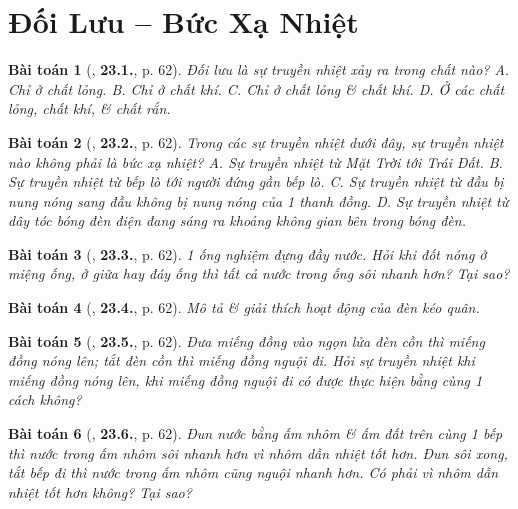 \documentclass{article}
\numberwithin{equation}{section}
\newtheorem{baitoan}{Bài toán}
\begin{document}

\section{Đối Lưu -- Bức Xạ Nhiệt}

\begin{baitoan}[\cite{SBT_Vat_Ly_8}, \textbf{23.1.}, p. 62]
	Đối lưu là sự truyền nhiệt xảy ra trong chất nào? {\sf A.} Chỉ ở chất lỏng. {\sf B.} Chỉ ở chất khí. {\sf C.} Chỉ ở chất lỏng \& chất khí. {\sf D.} Ở các chất lỏng, chất khí, \& chất rắn.
\end{baitoan}

\begin{baitoan}[\cite{SBT_Vat_Ly_8}, \textbf{23.2.}, p. 62]
	Trong các sự truyền nhiệt dưới đây, sự truyền nhiệt nào không phải là bức xạ nhiệt? {\sf A.} Sự truyền nhiệt từ Mặt Trời tới Trái Đất. {\sf B.} Sự truyền nhiệt từ bếp lò tới người đứng gần bếp lò. {\sf C.} Sự truyền nhiệt từ đầu bị nung nóng sang đầu không bị nung nóng của 1 thanh đồng. {\sf D.} Sự truyền nhiệt từ dây tóc bóng đèn điện đang sáng ra khoảng không gian bên trong bóng đèn.
\end{baitoan}

\begin{baitoan}[\cite{SBT_Vat_Ly_8}, \textbf{23.3.}, p. 62]
	1 ống nghiệm đựng đầy nước. Hỏi khi đốt nóng ở miệng ống, ở giữa hay đáy ống thì tất cả nước trong ống sôi nhanh hơn? Tại sao?
\end{baitoan}

\begin{baitoan}[\cite{SBT_Vat_Ly_8}, \textbf{23.4.}, p. 62]
	Mô tả \& giải thích hoạt động của đèn kéo quân.
\end{baitoan}

\begin{baitoan}[\cite{SBT_Vat_Ly_8}, \textbf{23.5.}, p. 62]
	Đưa miếng đồng vào ngọn lửa đèn cồn thì miếng đồng nóng lên; tắt đèn cồn thì miếng đồng nguội đi. Hỏi sự truyền nhiệt khi miếng đồng nóng lên, khi miếng đồng nguội đi có được thực hiện bằng cùng 1 cách không?
\end{baitoan}

\begin{baitoan}[\cite{SBT_Vat_Ly_8}, \textbf{23.6.}, p. 62]
	Đun nước bằng ấm nhôm \& ấm đất trên cùng 1 bếp thì nước trong ấm nhôm sôi nhanh hơn vì nhôm dẫn nhiệt tốt hơn. Đun sôi xong, tắt bếp đi thì nước trong ấm nhôm cũng nguội nhanh hơn. Có phải vì nhôm dẫn nhiệt tốt hơn không? Tại sao?
\end{baitoan}
\end{document}
